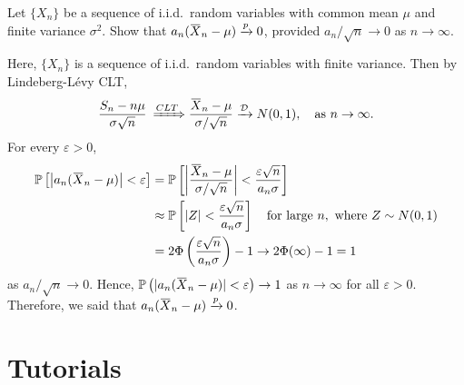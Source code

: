 \begin{example}
    Let $\{X_n\}$ be a sequence of i.i.d.\ random variables with
    common mean $\mu$ and finite variance $\sigma^2$. Show that
    $a_n(\ols{X}_n - \mu) \xrightarrow[]{p} 0$, provided $a_n / \sqrt{n} \to 0$ as $n \to \infty$.
\end{example}
\begin{solution}
    Here, $\{X_n\}$ is a sequence of i.i.d.\ random variables with finite variance.
    Then by Lindeberg-L\'evy CLT,
    \[
        \frac{S_n - n\mu}{\sigma\sqrt{n}} \>
        \xRightarrow[]{CLT} \frac{\ols{X}_n - \mu}{\sigma / \sqrt{n}} \xrightarrow[]{\mathcal{D}} N(0,1), \quad \text{as } n \to \infty.
    \]
    For every $\varepsilon > 0$,
    \begin{align*}
        \mathbb{P}\left[ \left| a_n(\ols{X}_n - \mu) \right| < \varepsilon \right]
        &= \mathbb{P}\left[ \left| \frac{\ols{X}_n - \mu}{\sigma / \sqrt{n}} \right| < \frac{\varepsilon \sqrt{n}}{a_n \sigma} \right]\\
        &\approx \mathbb{P}\left[ |Z| < \frac{\varepsilon \sqrt{n}}{a_n \sigma} \right] \quad \text{for large } n, \text{ where } Z \sim N(0,1)\\
        &= 2\Phi\left( \frac{\varepsilon \sqrt{n}}{a_n \sigma} \right) - 1 \to 2\Phi(\infty) - 1 = 1
    \end{align*}
    as $a_n / \sqrt{n} \to 0$.
    Hence, $\mathbb{P}\left( |a_n(\ols{X}_n - \mu)| < \varepsilon \right) \to 1$ as $n \to \infty$ for all 
    $\varepsilon > 0$. Therefore, we said that $a_n(\ols{X}_n - \mu) \xrightarrow[]{p} 0$.
\end{solution}

\section*{Tutorials}

